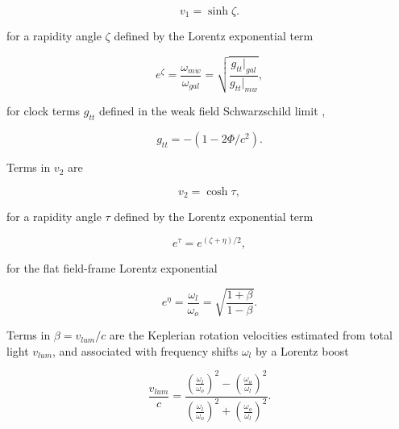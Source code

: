 \documentclass[reprint,%
 amsmath,amssymb,
 aps,
]{revtex4-1}
\begin{document}
   \begin{equation}
       v_1 = \sinh \zeta. 
   \end{equation}
 
 for a rapidity angle $\zeta$ defined by the    Lorentz exponential  term  
  
   
     \begin{equation}
     e^{\zeta}=  \frac{\omega_{mw}}{\omega_{gal}}  =\sqrt{\frac{g_{tt}|_{gal}}{g_{tt}|_{mw}}},
      \label{eq:gravRS}
    \end{equation}
    
 for  clock terms $g_{tt}$   defined in the   weak field Schwarzschild limit  \cite{Hartle}, 
 
  \begin{equation}
      g_{tt}= -( 1 - 2\Phi/ c^2).
      \label{clocktime}
  \end{equation} 
  

Terms in $v_2$ are 

\begin{equation}
v_{2} =  \cosh \tau, 
\label{eq:hyperbolico}
\end{equation}


 
 
  for a rapidity angle $\tau$ defined by the    Lorentz exponential  term  
  
 
\begin{equation}
    e^{\tau}=   e^{(\zeta+\eta)/2},
\end{equation}
 
for the  flat field-frame
Lorentz exponential  

\begin{equation}
    e^{\eta}=\frac{\omega_{l}}{\omega_o}= \sqrt{\frac{1+\beta}{1-\beta}}.   
    \label{eq:flat}
\end{equation}  
     
Terms in 
$\beta = v_{lum}/c$ are the
Keplerian rotation velocities  estimated from total light  $v_{lum}$, and  associated with  frequency shifts $\omega_{l}$      by a Lorentz boost   

 \begin{equation}
 \frac{v_{lum} }{c}=
\frac{  \left( \frac{\omega_{l}}{\omega_o}\right)^2 -  \left( \frac{\omega_o}{\omega_{l}} \right)^2 }{  \left( \frac{\omega_{l}}{\omega_o}\right)^2  +  \left( \frac{\omega_o}{\omega_{l}}\right)^2 }. 
\label{eq:lumlorentz}
\end{equation} 
 
 
  
 
 
\end{document}
